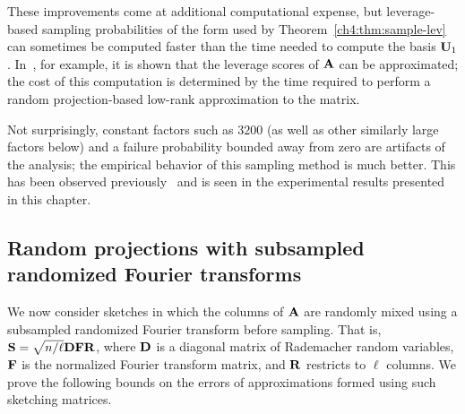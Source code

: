 \begin{remark}
These improvements come at additional computational expense, but 
leverage-based sampling probabilities of the form used by 
Theorem~\ref{ch4:thm:sample-lev} can sometimes be computed faster than the time
needed to compute the basis $\mathbf{U}_1$. In~\cite{DMMW12}, for example, it is
shown that the leverage scores of $\mathbf{A}$ can be approximated; the cost of this
computation is determined by the time required to perform a random projection-based
low-rank approximation to the matrix.
\end{remark}

\begin{remark}
Not surprisingly, constant factors such as $3200$ (as well as other 
similarly large factors below) and a failure probability bounded away from zero are artifacts of the analysis; the 
empirical behavior of this sampling method is much better.
This has been observed previously~\cite{DMM08CUR,DM09CUR} and is seen in the experimental
results presented in this chapter.
\end{remark}

\subsection{Random projections with subsampled randomized Fourier transforms}
\label{ch4:sec:theory-rand-fourier}
We now consider sketches in which the columns of $\mathbf{A}$ are randomly mixed 
using a subsampled randomized Fourier transform before sampling. 
That is, $\mathbf{S} = \sqrt{n/\ell} \mathbf{D} \mathbf{F} \mathbf{R}$, where 
$\mathbf{D}$ is a diagonal matrix of Rademacher random variables, $\mathbf{F}$ is the 
normalized Fourier transform matrix, and $\mathbf{R}$ restricts to $\ell$ columns. 
We prove the following bounds on the errors of approximations formed using such
sketching matrices.

